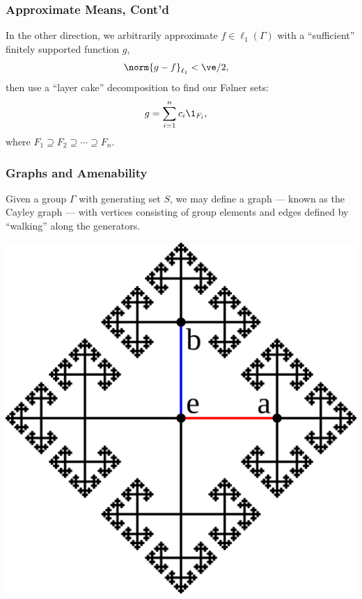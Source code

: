 \documentclass{beamer-custom}
\begin{document}
\begin{frame}
  \frametitle{Approximate Means, Cont'd}
  In the other direction, we arbitrarily approximate $f\in\ell_1\left( \Gamma \right)$ with a ``sufficient'' finitely supported function $g$,
  \begin{align*}
    \norm{g - f}_{\ell_1} &< \ve/2,
  \end{align*}
  then use a ``layer cake'' decomposition to find our Følner sets:
  \begin{align*}
    g &= \sum_{i=1}^{n}c_i\1_{F_i},
  \end{align*}
  where $F_1\supseteq F_2\supseteq \cdots \supseteq F_n$.
\end{frame}
\begin{frame}
  \frametitle{Graphs and Amenability}
  Given a group $\Gamma$ with generating set $S$, we may define a graph --- known as the Cayley graph --- with vertices consisting of group elements and edges defined by ``walking'' along the generators.\pause
  \begin{center}
    \includegraphics[scale=0.06]{images/cayley_graph.png}
  \end{center}
\end{frame}
\end{document}
